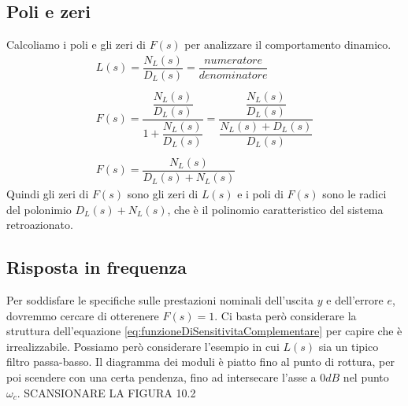 \documentclass[a4paper]{report}
\begin{document}
\subsection{Poli e zeri}
Calcoliamo i poli e gli zeri di $F(s)$ per analizzare il comportamento
dinamico.
\[
\begin{array}{l}
  L(s) = \dfrac{N_L(s)}{D_L(s)} = \dfrac{numeratore}{denominatore}\\
  \\
  F(s) = \dfrac{\dfrac{N_L(s)}{D_L(s)}}{1 + \dfrac{N_L(s)}{D_L(s)}} = 
  \dfrac{\dfrac{N_L(s)}{D_L(s)}}{\dfrac{N_L(s) + D_L(s)}{D_L(s)}}\\
  \\
  F(s) = \dfrac{N_L(s)}{D_L(s) + N_L(s)}
\end{array}
\]
Quindi gli zeri di $F(s)$ sono gli zeri di $L(s)$ e i poli di $F(s)$
sono le radici del polonimio $D_L(s) + N_L(s)$, che \`e il polinomio
caratteristico del sistema retroazionato.

\subsection{Risposta in frequenza}
Per soddisfare le specifiche sulle prestazioni nominali dell'uscita
$y$ e dell'errore $e$, dovremmo cercare di otterenere $F(s) = 1$. Ci
basta per\`o considerare la struttura dell'equazione
\ref{eq:funzioneDiSensitivitaComplementare} per capire che \`e
irrealizzabile. Possiamo per\`o considerare l'esempio in cui $L(s)$
sia un tipico filtro passa-basso. Il diagramma dei moduli \`e piatto
fino al punto di rottura, per poi scendere con una certa pendenza,
fino ad intersecare l'asse a $0 dB$ nel punto $\omega_c$. SCANSIONARE
LA FIGURA 10.2 
\end{document}
